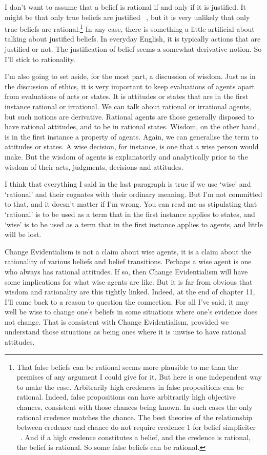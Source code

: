 I don't want to assume that a belief is rational if and only if it is justified. It might be that only true beliefs are justified ~\citep{Littlejohn2012}, but it is very unlikely that only true beliefs are rational.\footnote{That false beliefs can be rational seems more plausible to me than the premises of any argument I could give for it. But here is one independent way to make the case. Arbitrarily high credences in false propositions can be rational. Indeed, false propositions can have arbitrarily high objective chances, consistent with those chances being known. In such cases the only rational credence matches the chance. The best theories of the relationship between credence and chance do not require credence 1 for belief simpliciter ~\citep{Weatherson2014}. And if a high credence constitutes a belief, and the credence is rational, the belief is rational. So some false beliefs can be rational.} In any case, there is something a little artificial about talking about justified beliefs. In everyday English, it is typically actions that are justified or not. The justification of belief seems a somewhat derivative notion. So I'll stick to rationality.

I'm also going to set aside, for the most part, a discussion of wisdom. Just as in the discussion of ethics, it is very important to keep evaluations of agents apart from evaluations of acts or states. It is attitudes or states that are in the first instance rational or irrational. We can talk about rational or irrational agents, but such notions are derivative. Rational agents are those generally disposed to have rational attitudes, and to be in rational states. Wisdom, on the other hand, is in the first instance a property of agents. Again, we can generalise the term to attitudes or states. A wise decision, for instance, is one that a wise person would make. But the wisdom of agents is explanatorily and analytically prior to the wisdom of their acts, judgments, decisions and attitudes.

I think that everything I said in the last paragraph is true if we use `wise' and `rational' and their cognates with their ordinary meaning. But I'm not committed to that, and it doesn't matter if I'm wrong. You can read me as stipulating that `rational' is to be used as a term that in the first instance applies to states, and `wise' is to be used as a term that in the first instance applies to agents, and little will be lost.

Change Evidentialism is not a claim about wise agents, it is a claim about the rationality of various beliefs and belief transitions. Perhaps a wise agent is one who always has rational attitudes. If so, then Change Evidentialism will have some implications for what wise agents are like. But it is far from obvious that wisdom and rationality are this tightly linked. Indeed, at the end of chapter 11, I'll come back to a reason to question the connection. For all I've said, it may well be wise to change one's beliefs in some situations where one's evidence does not change. That is consistent with Change Evidentialism, provided we understand those situations as being ones where it is unwise to have rational attitudes.


